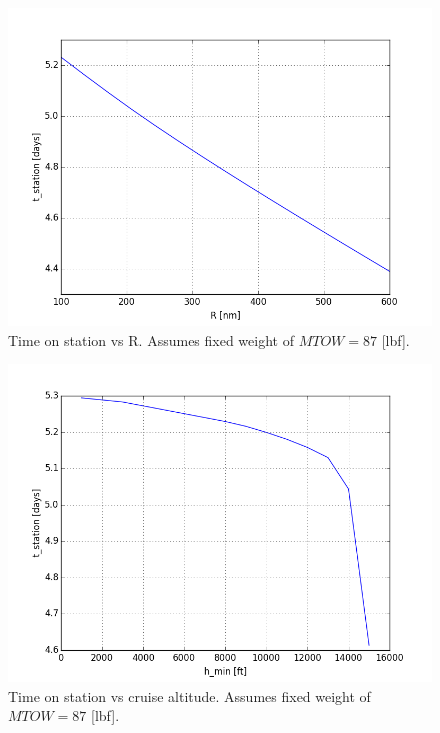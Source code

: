 \documentclass[10pt, a4paper]{article}
\begin{document}
\begin{figure}[h!]
\begin{center}
\includegraphics[scale = .5]{tvsR}
\caption{Time on station vs R. Assumes fixed weight of $MTOW = 87$ [lbf].}
\end{center}
\end{figure}

\begin{figure}[h!]
\begin{center}
\includegraphics[scale = .5]{tvsh_min}
\caption{Time on station vs cruise altitude. Assumes fixed weight of $MTOW = 87$ [lbf].}
\end{center}
\end{figure}
\end{document}
